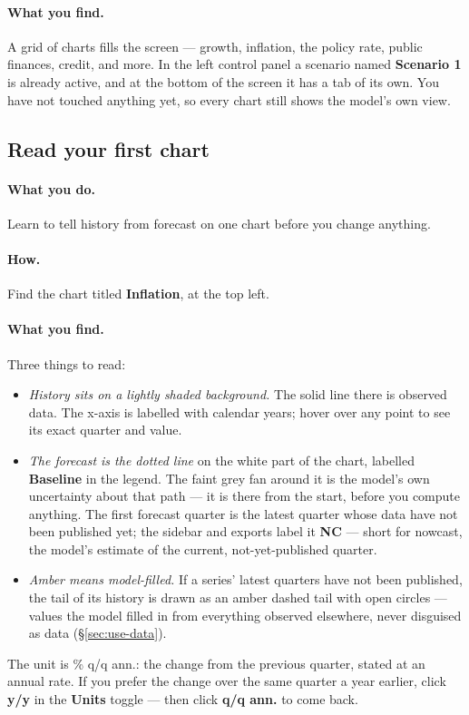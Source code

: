 \documentclass[11pt]{article}
\theoremstyle{definition}
\theoremstyle{remark}
\begin{document}
\paragraph{What you find.} A grid of charts fills the screen --- growth, inflation,
the policy rate, public finances, credit, and more. In the left control panel a
scenario named \textbf{Scenario 1} is already active, and at the bottom of the
screen it has a tab of its own. You have not touched anything yet, so every chart
still shows the model's own view.

\subsection{Read your first chart}

\paragraph{What you do.} Learn to tell history from forecast on one chart before
you change anything.

\paragraph{How.} Find the chart titled \textbf{Inflation}, at the top left.

\paragraph{What you find.} Three things to read:
\begin{itemize}
  \item \emph{History sits on a lightly shaded background.} The solid line there is
    observed data. The x-axis is labelled with calendar years; hover over any point
    to see its exact quarter and value.
  \item \emph{The forecast is the dotted line} on the white part of the chart,
    labelled \textbf{Baseline} in the legend. The faint grey fan around it is the
    model's own uncertainty about that path --- it is there from the start, before
    you compute anything. The first forecast quarter is the latest quarter whose
    data have not been published yet; the sidebar and exports label it
    \textbf{NC} --- short for nowcast, the model's estimate of the current,
    not-yet-published quarter.
  \item \emph{Amber means model-filled.} If a series' latest quarters have not been
    published, the tail of its history is drawn as an amber dashed tail with
    open circles --- values the model filled in from everything observed elsewhere,
    never disguised as data (\S\ref{sec:use-data}).
\end{itemize}
The unit is \% q/q ann.: the change from the previous quarter, stated at an annual
rate. If you prefer the change over the same quarter a year earlier, click
\textbf{y/y} in the \textbf{Units} toggle --- then click \textbf{q/q ann.} to come
back.
\end{document}
